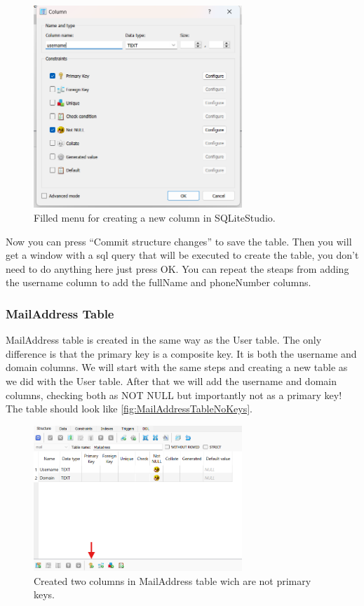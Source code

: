 \documentclass[a4paper,11pt,oneside]{article}
\begin{document}
\begin{sloppypar}
\begin{figure}[!htb]
  \centering
  \includegraphics[width=0.7\textwidth]{sqlitestudio/create_user/create_user_column_populated.png}
  \caption{Filled menu for creating a new column in SQLiteStudio.}
  \label{fig:FilledNewColumnUser}
\end{figure}
Now you can press ``Commit structure changes'' to save the table. Then you will get a window with a sql query that will be executed to create the table, you don't need to do anything here just press OK. 
You can repeat the steaps from adding the username column to add the fullName and phoneNumber columns.   

\subsubsection{MailAddress Table}
\label{sqliteStudioMailAddressTable}
MailAddress table is created in the same way as the User table. The only difference is that the primary key is a composite key. It is both the username and domain columns. We will start with the same steps and creating a new table as we did with the User table. After that we will add the username and domain columns, checking both as NOT NULL but importantly not as a primary key! The table should look like \autoref{fig:MailAddressTableNoKeys}.
\begin{figure}[!htb]
  \centering
  \includegraphics[width=0.7\textwidth]{sqlitestudio/create_mail_address/create_mail.png}
  \caption{Created two columns in MailAddress table wich are not primary keys.} 
  \label{fig:MailAddressTableNoKeys}
\end{figure}


\end{sloppypar}
\end{document}
